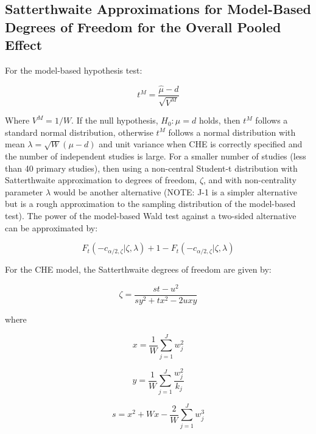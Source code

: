 
\subsection{Satterthwaite Approximations for Model-Based Degrees of Freedom for the Overall Pooled Effect}

For the model-based hypothesis test:

\begin{equation} \label{model-basedwaldtest}
 t^M = \frac{\hat{\mu} - d}{\sqrt{V^M}}
\end{equation}

Where $V^M = 1/W$. If the null hypothesis, $H_0: \mu = d$ holds, then $t^M$ follows a standard normal distribution, otherwise $t^M$ follows a normal distribution with mean $\lambda = \sqrt{W}(\mu - d)$ and unit variance when CHE is correctly specified and the number of independent studies is large. For a smaller number of studies (less than 40 primary studies), then using a non-central Student-t distribution with Satterthwaite approximation to degrees of freedom, $\zeta$, and with non-centrality parameter $\lambda$ would be another alternative (NOTE: J-1 is a simpler alternative but is a rough approximation to the sampling distribution of the model-based test). The power of the model-based Wald test against a two-sided alternative can be approximated by:

\begin{equation}
    F_t(-c_{\alpha/2,\zeta}  | \zeta, \lambda) +1 - F_t(-c_{\alpha/2,\zeta}  | \zeta, \lambda) 
\end{equation}




For the CHE model, the Satterthwaite degrees of freedom are given by:

\begin{equation}\label{CHEdf}
    \zeta = \frac{st - u^2}{sy^2 + tx^2 - 2uxy}
\end{equation}

where 

\begin{equation}
     x = \frac{1}{W} \sum_{j=1}^J w^2_j
\end{equation}

\begin{equation}
    y = \frac{1}{W}\sum_{j=1}^J \frac{w^2_j}{k_j}
\end{equation}

\begin{equation}
    s = x^2 + Wx - \frac{2}{W}\sum_{j=1}^J w^3_j
\end{equation}

